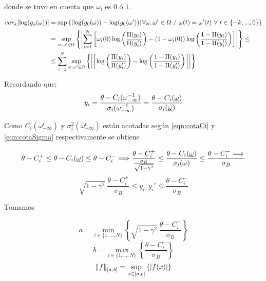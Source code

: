 donde se tuvo en cuenta que $\omega_i$ es $0$ ó $1$.

\begin{align}
\nonumber    var_k[\log(g_o(\omega))] &= \sup \left\{  \left|\log(g_0(\omega)) - \log(g_0(\omega'))\right|  \forall \omega,\omega' \in \Omega \ / \  \omega(t) = \omega'(t) \ \forall \ t \in \{-k,...,0\} \right\}\\
\nonumber    &=\sup_{\omega,\omega' \in \Omega} \left\{  \left|\sum_{i=1}^N \left[ \omega_i(0) \log\left(\frac{\Pi(y_i)}{\Pi(y_i')}\right) - (1-\omega_i(0)) \log \left(\frac{1-\Pi(y_i)}{1-\Pi(y_i')} \right) \right]\right| \right\} \leq \\
    & \leq \sum_{i=1}^N \sup_{\omega,\omega' \in \Omega} \left\{  \left| \left[ \log\left(\frac{\Pi(y_i)}{\Pi(y_i')}\right) - \log\left(\frac{1-\Pi(y_i)}{1-\Pi(y_i')}\right) \right]\right| \right\}
    \label{eqn:varlog1}
\end{align}

Recordando que:
\begin{align*}
    y_i= \frac{\theta - C_i(\omega_{-\infty}^{-1})} {\sigma_i(\omega_{-\infty}^{-1})} = 
         \frac{\theta - C_i(\underline{\omega})} {\sigma_i(\underline{\omega})}
\end{align*}

Como $C_i(\omega_{-\infty}^t)$ y $\sigma_i^2(\omega_{-\infty}^t)$ están acotadas según \eqref{eqn:cotaCi} y \eqref{eqn:cotaSigma} respectivamente se obtiene

\begin{equation}
    \theta - C_i^+ \leq \theta - C_i(\underline{\omega}) \leq \theta - C_i^- \Longrightarrow
    \frac{\theta - C_i^+}{\frac{\sigma_B}{\sqrt{1-\gamma^2}}} \leq \frac{\theta - C_i(\underline{\omega})}{\sigma_i(\omega)} \leq \frac{\theta - C_i^- \Longrightarrow }{\sigma_B}    
\end{equation}
\begin{equation}
    \sqrt{1-\gamma^2}~\frac{\theta - C_i^+}{\sigma_B} \leq y_i, y_i' \leq \frac{\theta - C_i^- }{\sigma_B}
\end{equation}

Tomamos 

\begin{equation*}
    a= \min_{i\in\{1,...,N\}} \left\{\sqrt{1-\gamma^2}~\frac{\theta - C_i^+}{\sigma_B} \right\}
\end{equation*}
\begin{equation*}
    b= \max_{i\in\{1,...,N\}} \left\{\frac{\theta - C_i^-}{\sigma_B} \right\}
\end{equation*}
\begin{equation*}
    \left\lVert f\right\rVert_{[a,b]} = \sup_{x\in[a,b]} \left\{ \left|f(x)\right|\right\}
\end{equation*}

